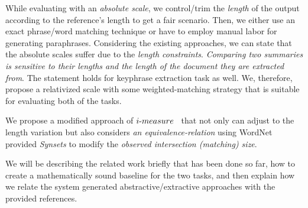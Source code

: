 \documentclass[a4paper]{report}
\begin{document}
\par While evaluating with an \emph{absolute scale}, we control/trim the \emph{length} of the output according to the reference's length to get a fair scenario. Then, we either use an exact phrase/word matching technique or have to employ manual labor for generating paraphrases. Considering the existing approaches, we can state that the absolute scales suffer due to the \emph{length constraints}. \emph{Comparing two summaries is sensitive to their lengths and the length of the document they are extracted from}. The statement holds for keyphrase extraction task as well. We, therefore, propose a relativized scale with some weighted-matching strategy that is suitable for evaluating both of the tasks. 
\par  We propose a modified approach of $i\hbox{-}measure$~\cite{DBLP:conf/ecir/HamidHT16} that not only can adjust to the length variation but also considers \emph{an equivalence-relation} using WordNet provided \emph{Synsets} to modify the \emph{observed intersection (matching) size}.
\par We will be describing the related work briefly that has been done so far, how to create a mathematically sound baseline for the two tasks, and then explain how we relate the system generated abstractive/extractive approaches with the provided references.
\end{document}
